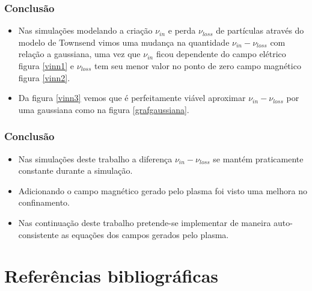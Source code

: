 \documentclass[aspectratio=169]{beamer}
\begin{document}
	
	
	  \begin{frame}
			\frametitle{Conclusão}
		\begin{itemize}
			 \item  Nas simulações modelando a criação $\nu_{in}$ e perda $ \nu_{loss}$ de partículas através do modelo de Townsend vimos uma mudança na quantidade $\nu_{in}-\nu_{loss}$ com relação a gaussiana, uma vez que $\nu_{in}$ ficou dependente do campo elétrico figura \ref{vinn1} e $ \nu_{loss}$ tem seu menor valor no ponto de zero campo magnético figura \ref{vinn2}. 
			 \item Da figura \ref{vinn3} vemos que é perfeitamente viável aproximar $\nu_{in}-\nu_{loss}$ por uma gaussiana como na figura \ref{grafgaussiana}. 

		\end{itemize}

	\end{frame}	
	  \begin{frame}
			\frametitle{Conclusão}
		\begin{itemize}
					 \item Nas simulações deste trabalho a diferença $\nu_{in}-\nu_{loss}$ se mantém praticamente constante durante a  simulação.
              \item  Adicionando o campo magnético gerado pelo plasma foi visto uma melhora no confinamento. 
              \item Nas continuação deste trabalho pretende-se implementar de maneira auto-consistente as equações dos campos gerados pelo plasma.
		\end{itemize}

	\end{frame}	

\section{Refer\^{e}ncias bibliogr\'{a}ficas}
\end{document}
